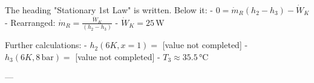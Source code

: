 The heading "Stationary 1st Law" is written. Below it:  
- \( 0 = \dot{m}_R (h_2 - h_3) - \dot{W}_K \)  
- Rearranged: \( \dot{m}_R = \frac{\dot{W}_K}{(h_2 - h_3)} \)  
- \( \dot{W}_K = 25 \, \text{W} \)  

Further calculations:  
- \( h_2 (6K, x = 1) = \) [value not completed]  
- \( h_3 (6K, 8 \, \text{bar}) = \) [value not completed]  
- \( T_3 \approx 35.5 \, \text{°C} \)  

---